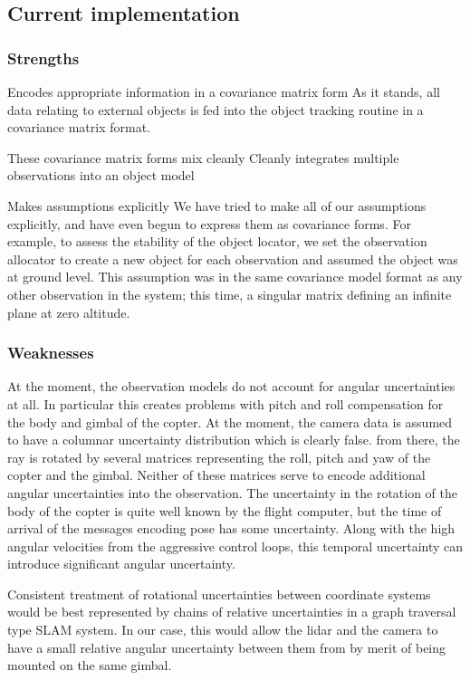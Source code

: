 \documentclass[a4paper, 11pt, titlepage]{article}
\begin{document}
  \subsection{Current implementation}
    \subsubsection{Strengths}
      
      Encodes appropriate information in a covariance matrix form
      As it stands, all data relating to external objects is fed into the object tracking routine in a covariance matrix format.  

      These covariance matrix forms mix cleanly 
      Cleanly integrates multiple observations into an object model

      Makes assumptions explicitly
      We have tried to make all of our assumptions explicitly, and have even begun to express them as covariance forms.
      For example, to assess the stability of the object locator, we set the observation allocator to create a new object for each observation and assumed the object was at ground level.  This assumption was in the same covariance model format as any other observation in the system; this time, a singular matrix defining an infinite plane at zero altitude.


    \subsubsection{Weaknesses}
      At the moment, the observation models do not account for angular uncertainties at all.  In particular this creates problems with pitch and roll compensation for the body and gimbal of the copter.
      At the moment, the camera data is assumed to have a columnar uncertainty distribution which is clearly false.  from there, the ray is rotated by several matrices representing the roll, pitch and yaw of the copter and the gimbal.  Neither of these matrices serve to encode additional angular uncertainties into the observation.
      The uncertainty in the rotation of the body of the copter is quite well known by the flight computer, but the time of arrival of the messages encoding pose has some uncertainty.  Along with the high angular velocities from the aggressive control loops, this temporal uncertainty can introduce significant angular uncertainty.

      Consistent treatment of rotational uncertainties between coordinate systems would be best represented by chains of relative uncertainties in a graph traversal type SLAM system.  In our case, this would allow the lidar and the camera to have a small relative angular uncertainty between them from by merit of being mounted on the same gimbal.
\end{document}
